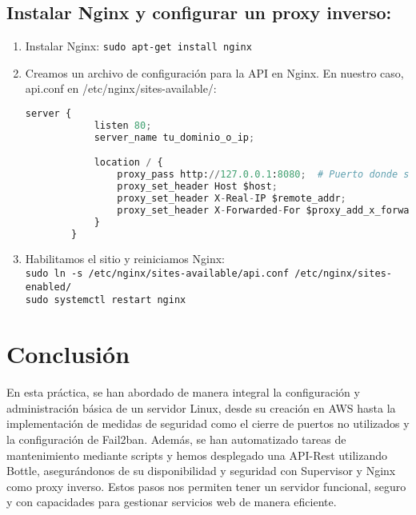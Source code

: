 \documentclass{article}
\begin{document}
\subsection{Instalar Nginx y configurar un proxy inverso:}
\begin{enumerate}
    \item Instalar Nginx: \texttt{sudo apt-get install nginx}
    \item Creamos un archivo de configuración para la API en Nginx. En nuestro caso, api.conf en /etc/nginx/sites-available/:
    \begin{lstlisting}[language=Python, caption=API básica con Bottle]
        server {
            listen 80;
            server_name tu_dominio_o_ip;

            location / {
                proxy_pass http://127.0.0.1:8080;  # Puerto donde se ejecuta la API con Bottle
                proxy_set_header Host $host;
                proxy_set_header X-Real-IP $remote_addr;
                proxy_set_header X-Forwarded-For $proxy_add_x_forwarded_for;
            }
        }
        \end{lstlisting}
    \item Habilitamos el sitio y reiniciamos Nginx:\\
        \texttt{sudo ln -s /etc/nginx/sites-available/api.conf /etc/nginx/sites-enabled/}\\ \texttt{sudo systemctl restart nginx}
\end{enumerate}


\section{Conclusión}
En esta práctica, se han abordado de manera integral la configuración y administración básica de un servidor Linux, desde su creación en AWS hasta la implementación de medidas de seguridad como el cierre de puertos no utilizados y la configuración de Fail2ban. Además, se han automatizado tareas de mantenimiento mediante scripts y hemos desplegado una API-Rest utilizando Bottle, asegurándonos de su disponibilidad y seguridad con Supervisor y Nginx como proxy inverso. Estos pasos nos permiten tener un servidor funcional, seguro y con capacidades para gestionar servicios web de manera eficiente.
\end{document}
